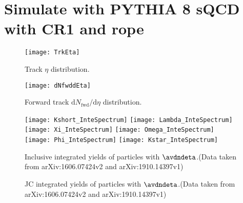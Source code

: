
\section{Simulate with PYTHIA 8 sQCD with CR1 and rope}%
\label{sec:CRorRope}

\begin{figure}[t]
        \begin{center}
                \texttt{[image: TrkEta]}
        \end{center}
        \caption{Track $\eta$ distribution.}
        \label{fig:TrkEta}
\end{figure}

\begin{figure}[t]
	\begin{center}
		\texttt{[image: dNfwddEta]}
	\end{center}
	\caption{Forward track $\mathrm{d}N_\mathrm{fwd}/\mathrm{d}\eta$ distribution.}
	\label{fig:TrkdNdEta}
\end{figure}

\begin{figure}[ht]
	\begin{center}
		\texttt{[image: Kshort\_InteSpectrum]}
		\texttt{[image: Lambda\_InteSpectrum]}
		\texttt{[image: Xi\_InteSpectrum]}
		\texttt{[image: Omega\_InteSpectrum]}
		\texttt{[image: Phi\_InteSpectrum]}
		\texttt{[image: Kstar\_InteSpectrum]}
	\end{center}
	\caption{Inclusive integrated yields of particles with $\avdndeta$.(Data taken from arXiv:1606.07424v2 and arXiv:1910.14397v1)}
	\label{fig:InclIntePar}
\end{figure}
\begin{figure}[ht]
	\begin{center}

		
	\end{center}
	\caption{JC integrated yields of particles with $\avdndeta$.(Data taken from arXiv:1606.07424v2 and arXiv:1910.14397v1)}
	\label{fig:JCIntePar}
\end{figure}


